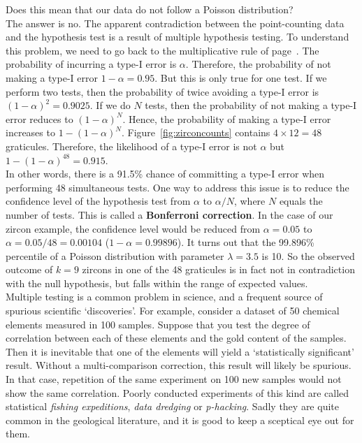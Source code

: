 Does this mean that our data do not follow a Poisson distribution?\\

The answer is no. The apparent contradiction between the
point-counting data and the hypothesis test is a result of multiple
hypothesis testing. To understand this problem, we need to go back to
the multiplicative rule of page~\pageref{page:multiplication}.  The
probability of incurring a type-I error is $\alpha$. Therefore, the
probability of not making a type-I error $1-\alpha=0.95$.  But this is
only true for one test. If we perform two tests, then the probability
of twice avoiding a type-I error is $(1-\alpha)^2=0.9025$. If we do
$N$ tests, then the probability of not making a type-I error reduces
to $(1-\alpha)^N$. Hence, the probability of making a type-I error
increases to $1-(1-\alpha)^N$. Figure~\ref{fig:zirconcounts} contains
${4}\times{12}=48$ graticules. Therefore, the likelihood of a type-I
error is not $\alpha$ but $1-(1-\alpha)^{48}=0.915$.\\

In other words, there is a 91.5\% chance of committing a type-I error
when performing 48 simultaneous tests. One way to address this issue
is to reduce the confidence level of the hypothesis test from $\alpha$
to $\alpha/N$, where $N$ equals the number of tests.  This is called a
\textbf{Bonferroni correction}. In the case of our zircon example, the
confidence level would be reduced from $\alpha=0.05$ to
$\alpha=0.05/48=0.00104$ ($1-\alpha=0.99896$).  It turns out that the
99.896\% percentile of a Poisson distribution with parameter
$\lambda=3.5$ is 10. So the observed outcome of $k=9$ zircons in one
of the 48 graticules is in fact not in contradiction with the null
hypothesis, but falls within the range of expected values.\\

Multiple testing is a common problem in science, and a frequent source
of spurious scientific `discoveries'. For example, consider a dataset
of 50 chemical elements measured in 100 samples. Suppose that you test
the degree of correlation between each of these elements and the gold
content of the samples. Then it is inevitable that one of the elements
will yield a `statistically significant' result. Without a
multi-comparison correction, this result will likely be spurious. In
that case, repetition of the same experiment on 100 new samples would
not show the same correlation. Poorly conducted experiments of this
kind are called statistical \emph{fishing expeditions}, \emph{data
  dredging} or \emph{p-hacking}. Sadly they are quite common in the
geological literature, and it is good to keep a sceptical eye out for
them.

